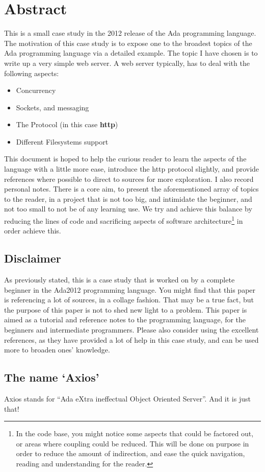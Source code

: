 \section{Abstract} 
This is a small case study in the 2012 release of the Ada programming language. The motivation of this case study is to expose one to the broadest topics of the Ada programming language via a detailed example. The topic I have chosen is to write up a very simple web server. A web server typically, has to deal with the following aspects:
\begin{itemize}
\item Concurrency
\item Sockets, and messaging
\item The Protocol (in this case \textbf{http})
\item Different Filesystems support
\end{itemize} 
This document is hoped to help the curious reader to learn the aspects of the language with a little more ease, introduce the http protocol slightly, and provide references where possible to direct to sources for more exploration. I also record personal notes. 
There is a core aim, to present the aforementioned array of topics to the reader, in a project that is not too big, and intimidate the beginner, and not too small to not be of any learning use. We try and achieve this balance by reducing the lines of code and sacrificing aspects of software architecture\footnote{In the code base, you might notice some aspects that could be factored out, or areas where coupling could be reduced. This will be done on purpose in order to reduce the amount of indirection, and ease the quick navigation, reading and understanding for the reader.} in order achieve this.

\subsection{Disclaimer}
As previously stated, this is a case study that is worked on by a complete beginner in the Ada2012 programming language. You might find that this paper is referencing a lot of sources, in a collage fashion. That may be a true fact, but the purpose of this paper is not to shed new light to a problem. This paper is aimed as a tutorial and reference notes to the programming language, for the beginners and intermediate programmers. Please also consider using the excellent references, as they have provided a lot of help in this case study, and can be used more to broaden ones' knowledge.

\subsection{The name `Axios'}
Axios stands for ``Ada eXtra ineffectual Object Oriented Server''. And it is just that!
